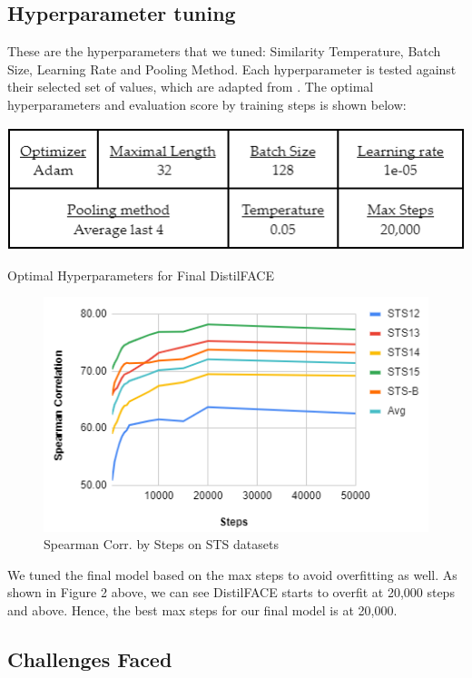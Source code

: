 \documentclass[10pt,twocolumn,letterpaper]{article}
\begin{document}
\subsection{Hyperparameter tuning}

These are the hyperparameters that we tuned: Similarity Temperature, Batch Size, Learning Rate and Pooling Method. Each hyperparameter is tested against their selected set of values, which are adapted from \cite{2104.08821}. The optimal hyperparameters and evaluation score by training steps is shown below:

\begin{table}[hbt!]
\centering
\includegraphics[scale=0.60]{images/Optimal-Hyperparameters.png}
\caption{Optimal Hyperparameters for Final DistilFACE}
\label{fig:short}
\end{table}

\begin{figure}[hbt!]
\centering
\includegraphics[scale=0.70]{images/Results-Evaluation-Score-by-Steps.png}
\caption{Spearman Corr. by Steps on STS datasets}
\label{fig:short}
\end{figure}

We tuned the final model based on the max steps to avoid overfitting as well. As shown in Figure 2 above, we can see DistilFACE starts to overfit at 20,000 steps and above. Hence, the best max steps for our final model is at 20,000.

\subsection{Challenges Faced}
\end{document}
